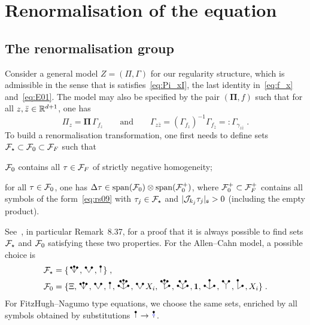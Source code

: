 \documentclass[reqno,11pt]{article}
\def\unit{\vone}
\def\bPi{\mathbf{\Pi}}
\DeclareMathOperator{\vspan}{span}
\def\abss#1{\abs{#1}_\mathfrak{s}}
\begin{document}

\section{Renormalisation of the equation}
\label{sec_renorm}


\subsection{The renormalisation group}
\label{ssec_renorm_gen}

Consider a general model $Z=(\Pi,\Gamma)$ for our regularity structure, which is
admissible in the sense that is satisfies~\eqref{eq:Pi_xI}, the last identity
in~\eqref{eq:f_x} and~\eqref{eq:E01}. The model may also be specified by
the pair $(\bPi,f)$ such that for all $z, \bar z\in\mathbb{R}^{d+1}$, one has 
\begin{equation}
 \label{eq:rgen01}
 \Pi_z = \bPi \,\Gamma_{f_z}
 \qquad \text{and} \qquad
 \Gamma_{z\bar z} = 
 (\Gamma_{f_z})^{-1} \Gamma_{f_{\bar z}}
 =: \Gamma_{\gamma_{z\bar z}}\;.
\end{equation} 
To build a renormalisation transformation, one first needs to define sets
${\mathcal F}_\star\subset{\mathcal F}_0\subset{\mathcal F}_F$ such that 
\begin{itemiz}
\item 	${\mathcal F}_0$ contains all $\tau\in{\mathcal F}_F$ of strictly negative homogeneity;
\item 	for all $\tau\in{\mathcal F}_0$, one has $\Delta\tau\in
\vspan(\cF_0)\otimes\vspan(\cF_0^+)$, where
${\mathcal F}_0^+\subset{\mathcal F}_F^+$ contains all symbols of the
form~\eqref{eq:rs09} with $\tau_j\in{\mathcal F}_\star$ and $\abss{\cJ_{k_j}\tau_j}>0$
(including the empty product). 
\end{itemiz}
%
See~\cite[Sect.~8.3]{Hairer2014}, in particular Remark~8.37, for a proof
that it is always possible to find sets ${\mathcal F}_\star$ and ${\mathcal F}_0$ satisfying these
two properties.
%
For the Allen--Cahn model, a possible choice is 
\begin{align}
\nonumber
\cF_\star &= \set{\RSW,\RSV,\RSI}\;, \\
\cF_0 &= \set{\Xi,\RSW,\RSV,\RSI,\RSWW,\RSV
X_i,\RSVW,\RSWV,\unit,\RSWI,\RSY,\RSVI,X_i}\;.
\label{eq:rgen02} 
\end{align}
For FitzHugh--Nagumo type equations, we choose the same sets, enriched by all
symbols obtained by substitutions $\RSI \to \RSoI$. 
\end{document}
